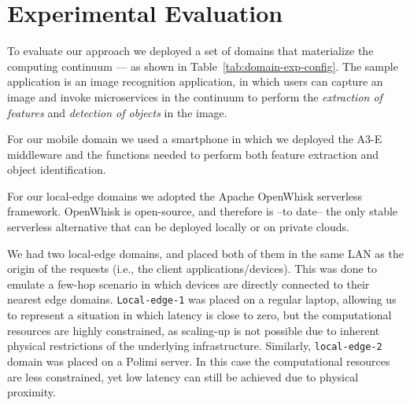 \section{Experimental Evaluation}\label{sec:evaluation}



To evaluate our approach we deployed a set of domains that materialize the computing continuum --- as shown in Table~\ref{tab:domain-exp-config}. The sample application is an image recognition application, in which users can capture an image and invoke microservices in the continuum to perform the \textit{extraction of features} and \textit{detection of objects} in the image.

For our mobile domain we used a smartphone in which we deployed the A3-E middleware and the functions needed to perform both feature extraction and object identification. 

For our local-edge domains we adopted the Apache OpenWhisk serverless framework. OpenWhisk is open-source, and therefore is --to date-- the only stable serverless alternative that can be deployed locally or on private clouds. 


We had two local-edge domains, and placed both of them in the same LAN as the origin of the requests (i.e., the client applications/devices). This was done to emulate a few-hop scenario in which devices are directly connected to their nearest edge domains. \texttt{Local-edge-1} was placed on a regular laptop, allowing us to represent a situation in which latency is close to zero, but the computational resources are highly constrained, as scaling-up is not possible due to inherent physical restrictions of the underlying infrastructure. Similarly, \texttt{local-edge-2} domain was placed on a Polimi server. In this case the computational resources are less constrained, yet low latency can still be achieved due to physical proximity.

